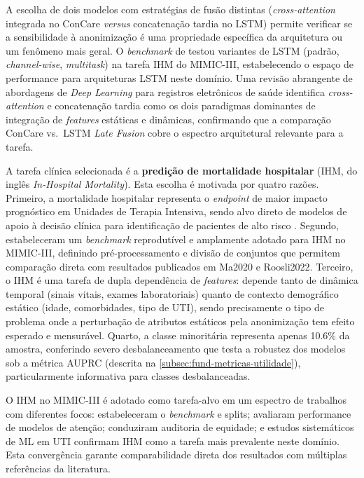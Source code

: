 A escolha de dois modelos com estratégias de fusão distintas (\textit{cross-attention} integrada no ConCare \textit{versus} concatenação tardia no LSTM) permite verificar se a sensibilidade à anonimização é uma propriedade específica da arquitetura ou um fenômeno mais geral. O \textit{benchmark} de  testou variantes de LSTM (padrão, \textit{channel-wise}, \textit{multitask}) na tarefa IHM do MIMIC-III, estabelecendo o espaço de performance para arquiteturas LSTM neste domínio. Uma revisão abrangente de abordagens de \textit{Deep Learning} para registros eletrônicos de saúde \cite{Shickel2018} identifica \textit{cross-attention} e concatenação tardia como os dois paradigmas dominantes de integração de \textit{features} estáticas e dinâmicas, confirmando que a comparação ConCare vs.\ LSTM \textit{Late Fusion} cobre o espectro arquitetural relevante para a tarefa.


A tarefa clínica selecionada é a \textbf{predição de mortalidade hospitalar} (IHM, do inglês \textit{In-Hospital Mortality}). Esta escolha é motivada por quatro razões. Primeiro, a mortalidade hospitalar representa o \textit{endpoint} de maior impacto prognóstico em Unidades de Terapia Intensiva, sendo alvo direto de modelos de apoio à decisão clínica para identificação de pacientes de alto risco \cite{Liu2025, Belle2015}. Segundo,  estabeleceram um \textit{benchmark} reprodutível e amplamente adotado para IHM no MIMIC-III, definindo pré-processamento e divisão de conjuntos que permitem comparação direta com resultados publicados em Ma2020 e Roosli2022. Terceiro, o IHM é uma tarefa de dupla dependência de \textit{features}: depende tanto de dinâmica temporal (sinais vitais, exames laboratoriais) quanto de contexto demográfico estático (idade, comorbidades, tipo de UTI), sendo precisamente o tipo de problema onde a perturbação de atributos estáticos pela anonimização tem efeito esperado e mensurável. Quarto, a classe minoritária representa apenas 10.6\% da amostra, conferindo severo desbalanceamento que testa a robustez dos modelos sob a métrica AUPRC (descrita na \autoref{subsec:fund-metricas-utilidade}), particularmente informativa para classes desbalanceadas.

O IHM no MIMIC-III é adotado como tarefa-alvo em um espectro de trabalhos com diferentes focos:  estabeleceram o \textit{benchmark} e splits;  avaliaram performance de modelos de atenção;  conduziram auditoria de equidade; e estudos sistemáticos de ML em UTI \cite{Syed2021} confirmam IHM como a tarefa mais prevalente neste domínio. Esta convergência garante comparabilidade direta dos resultados com múltiplas referências da literatura.

